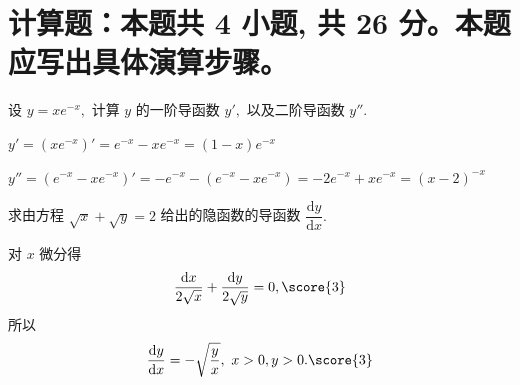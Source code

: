 \section{计算题：本题共 4 小题, 共 26 分。本题应写出具体演算步骤。}






\begin{question}[points = 8]
设 $y = xe^{-x},$ 计算 $y$ 的一阶导函数 $y',$ 以及二阶导函数 $y''.$

\end{question}

\begin{solution}
$y' = (xe^{-x})' = e^{-x} - xe^{-x} = (1 - x) e^{-x}$ 

$y'' = (e^{-x} - xe^{-x})' = -e^{-x} - (e^{-x} - xe^{-x}) = -2e^{-x} + xe^{-x} = (x - 2) ^{-x}$ 
\end{solution}


\begin{question}[points = 6]
求由方程 $\sqrt{x} + \sqrt{y} = 2$ 给出的隐函数的导函数 $\displaystyle \dfrac{\mathrm{d}y}{\mathrm{d}x}.$

\end{question}

\begin{solution}
对 $x$ 微分得
\begin{equation*}
\dfrac{\mathrm{d}x}{2\sqrt{x}} + \dfrac{\mathrm{d}y}{2\sqrt{y}} = 0, \score{3}
\end{equation*}
所以
\begin{equation*}
\dfrac{\mathrm{d}y}{\mathrm{d}x} = -\sqrt{\dfrac{y}{x}}, ~ x > 0, y > 0. \score{3}
\end{equation*}
\end{solution}


